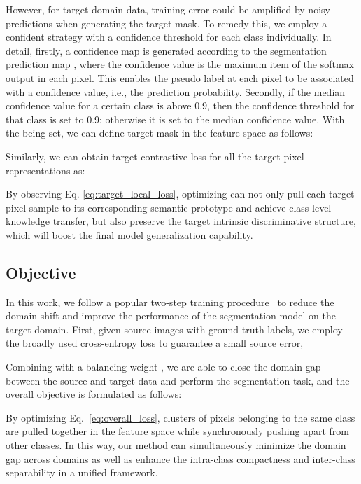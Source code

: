 \documentclass[runningheads]{llncs}
\begin{document}
However, for target domain data, training error could be amplified by noisy predictions when generating the target mask. To remedy this, we employ a confident strategy with a confidence threshold  for each class  individually. In detail, firstly, a confidence map is generated according to the segmentation prediction map , where the confidence value is the maximum item of the softmax output in each pixel. This enables the pseudo label at each pixel to be associated with a confidence value, i.e., the prediction probability. Secondly, if the median confidence value for a certain class is above 0.9, then the confidence threshold for that class is set to 0.9; otherwise it is set to the median confidence value. With the  being set, we can define target mask in the feature space as follows:
 \begin{small}
    
\end{small}

Similarly, we can obtain target contrastive loss for all the target pixel representations as:
 \begin{small}
    
\end{small}By observing Eq. \eqref{eq:target_local_loss}, optimizing  can not only pull each target pixel sample to its corresponding semantic prototype and achieve class-level knowledge transfer, but also preserve the target intrinsic discriminative structure, which will boost the final model generalization capability.



\subsection{Objective}
In this work, we follow a popular two-step training procedure~\cite{du2019ssf-dan,pan2020unsupervised,wang2020class,wang2020differential,zhang2019category} to reduce the domain shift and improve the performance of the segmentation model on the target domain. First, given source images with ground-truth labels, we employ the broadly used cross-entropy loss to guarantee a small source error,
 \begin{small}
     
\end{small}Combining  with a balancing weight , we are able to close the domain gap between the source and target data and perform the segmentation task, and the overall objective is formulated as follows:
 \begin{small}

\end{small}By optimizing Eq.~\eqref{eq:overall_loss}, clusters of pixels belonging to the same class are pulled together in the feature space while synchronously pushing apart from other classes. In this way, our method can simultaneously minimize the domain gap across domains as well as enhance the intra-class compactness and inter-class separability in a unified framework.
\end{document}
